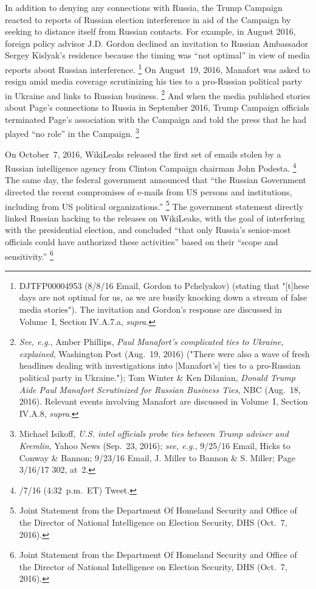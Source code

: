 In addition to denying any connections with Russia, the Trump Campaign reacted to reports of Russian election interference in aid of the Campaign by seeking to distance itself from Russian contacts.
For example, in August 2016, foreign policy advisor J.D. Gordon declined an invitation to Russian Ambassador Sergey Kislyak's residence because the timing was ``not optimal'' in view of media reports about Russian interference.%
\footnote{DJTFP00004953 (8/8/16 Email, Gordon to Pchelyakov) (stating that "[t]hese days are not optimal for us, as we are busily knocking down a stream of false media stories").
The invitation and Gordon's response are discussed in Volume~I, Section IV.A.7.a, \textit{supra}.}
On August~19, 2016, Manafort was asked to resign amid media coverage scrutinizing his ties to a pro-Russian political party in Ukraine and links to Russian business.%
\footnote{\textit{See, e.g.}, Amber Phillips, \textit{Paul Manafort's complicated ties to Ukraine, explained}, Washington Post (Aug.~19, 2016) ("There were also a wave of fresh headlines dealing with investigations into [Manafort's] ties to a pro-Russian political party in Ukraine.");
Tom Winter \& Ken Dilanian, \textit{Donald Trump Aide Paul Manafort Scrutinized for Russian Business Ties}, NBC (Aug.~18, 2016).
Relevant events involving Manafort are discussed in Volume~I, Section IV.A.8, \textit{supra}.}
And when the media published stories about Page's connections to Russia in September 2016, Trump Campaign officials terminated Page's association with the Campaign and told the press that he had played ``no role'' in the Campaign.%
\footnote{Michael Isikoff, \textit{U.S. intel officials probe ties between Trump adviser and Kremlin}, Yahoo News (Sep.~23, 2016);
\textit{see, e.g.}, 9/25/16 Email, Hicks to Conway \& Bannon;
9/23/16 Email, J. Miller to Bannon \& S. Miller;
Page 3/16/17 302, at~2.}

On October~7, 2016, WikiLeaks released the first set of emails stolen by a Russian intelligence agency from Clinton Campaign chairman John Podesta.%
\footnote{/7/16 (4:32~p.m.~ET) Tweet.}
The same day, the federal government announced that ``the Russian Government directed the recent compromises of e-mails from US persons and institutions, including from US political organizations.''%
\footnote{Joint Statement from the Department Of Homeland Security and Office of the Director of National Intelligence on Election Security, DHS (Oct.~7, 2016).}
The government statement directly linked Russian hacking to the releases on WikiLeaks, with the goal of interfering with the presidential election, and concluded ``that only Russia's senior-most officials could have authorized these activities'' based on their ``scope and sensitivity.''%
\footnote{Joint Statement from the Department Of Homeland Security and Office of the Director of National Intelligence on Election Security, DHS (Oct.~7, 2016).}

